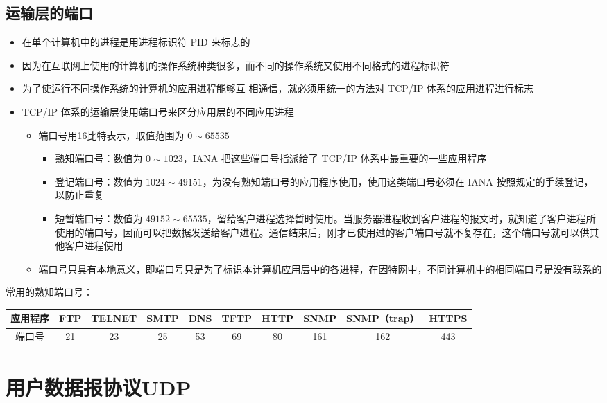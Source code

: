\documentclass[cs4size,a4paper,10pt]{ctexart}
\begin{document}
	\subsection{运输层的端口}
	\begin{itemize}
		\item 在单个计算机中的进程是用进程标识符 PID 来标志的
		\item 因为在互联网上使用的计算机的操作系统种类很多，而不同的操作系统又使用不同格式的进程标识符
		\item 为了使运行不同操作系统的计算机的应用进程能够互 相通信，就必须用统一的方法对 TCP/IP 体系的应用进程进行标志
		\item TCP/IP 体系的运输层使用端口号来区分应用层的不同应用进程
		\begin{itemize}
			\item 端口号用16比特表示，取值范围为 $0 \sim 65535$
			\begin{itemize}
				\item 熟知端口号：数值为 $0\sim 1023$，IANA 把这些端口号指派给了 TCP/IP 体系中最重要的一些应用程序
				\item 登记端口号：数值为 $1024 \sim 49151$，为没有熟知端口号的应用程序使用，使用这类端口号必须在 IANA 按照规定的手续登记，以防止重复
				\item 短暂端口号：数值为 $49152 \sim 65535$，留给客户进程选择暂时使用。当服务器进程收到客户进程的报文时，就知道了客户进程所使用的端口号，因而可以把数据发送给客户进程。通信结束后，刚才已使用过的客户端口号就不复存在，这个端口号就可以供其他客户进程使用
			\end{itemize}
			\item 端口号只具有本地意义，即端口号只是为了标识本计算机应用层中的各进程，在因特网中，不同计算机中的相同端口号是没有联系的
		\end{itemize}
	\end{itemize}

	常用的熟知端口号：
	\begin{table}[H]
		\centering
		\begin{tabular}{|c|c|c|c|c|c|c|c|c|c|}
		\hline
		应用程序 & FTP & TELNET & SMTP & DNS & TFTP & HTTP & SNMP & SNMP（trap） & HTTPS \\ \hline
		端口号  & 21  & 23     & 25   & 53  & 69   & 80   & 161  & 162        & 443   \\ \hline
		\end{tabular}
	\end{table}

	\section{用户数据报协议UDP}
\end{document}
